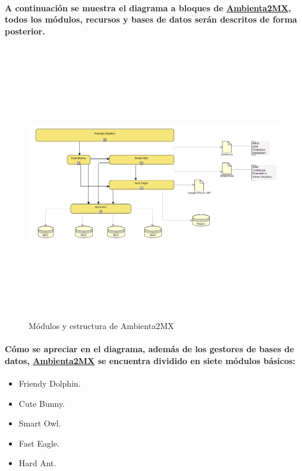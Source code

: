    \paragraph{A continuación se muestra el diagrama a bloques de \underline{Ambienta2MX}, todos los módulos, recursos y bases de datos serán descritos de forma posterior.}
  \newpage
    \begin{landscape}
      \begin{figure}[h!]
      \centering
      \includegraphics[width=22.5cm,height=12cm]{./images/DiagramaAmbienta2MX.png}
      \caption{Módulos y estructura de Ambienta2MX}
    \end{figure}
    \end{landscape}
  \newpage
    \paragraph{Cómo se apreciar en el diagrama, además de los gestores de bases de datos, \underline{Ambienta2MX} se encuentra dividido en siete módulos básicos:}
    \begin{itemize}
    \item Friendy Dolphin.
    \item Cute Bunny.
    \item Smart Owl.
    \item Fast Eagle.
    \item Hard Ant.
  \end{itemize}
